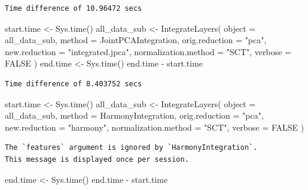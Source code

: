 \documentclass[
  letterpaper,
  DIV=11,
  numbers=noendperiod]{scrreprt}
\newenvironment{Shaded}{\begin{snugshade}}{\end{snugshade}}
\newcommand{\AttributeTok}[1]{\textcolor[rgb]{0.40,0.45,0.13}{#1}}
\newcommand{\ConstantTok}[1]{\textcolor[rgb]{0.56,0.35,0.01}{#1}}
\newcommand{\FunctionTok}[1]{\textcolor[rgb]{0.28,0.35,0.67}{#1}}
\newcommand{\NormalTok}[1]{\textcolor[rgb]{0.00,0.23,0.31}{#1}}
\newcommand{\OtherTok}[1]{\textcolor[rgb]{0.00,0.23,0.31}{#1}}
\newcommand{\SpecialCharTok}[1]{\textcolor[rgb]{0.37,0.37,0.37}{#1}}
\newcommand{\StringTok}[1]{\textcolor[rgb]{0.13,0.47,0.30}{#1}}
\begin{document}
\begin{verbatim}
Time difference of 10.96472 secs
\end{verbatim}

\begin{Shaded}
\begin{Highlighting}[]
\NormalTok{start.time }\OtherTok{\textless{}{-}} \FunctionTok{Sys.time}\NormalTok{()}
\NormalTok{all\_data\_sub }\OtherTok{\textless{}{-}} \FunctionTok{IntegrateLayers}\NormalTok{(}
  \AttributeTok{object =}\NormalTok{ all\_data\_sub, }\AttributeTok{method =}\NormalTok{ JointPCAIntegration,}
  \AttributeTok{orig.reduction =} \StringTok{"pca"}\NormalTok{, }\AttributeTok{new.reduction =} \StringTok{"integrated.jpca"}\NormalTok{, }\AttributeTok{normalization.method =} \StringTok{"SCT"}\NormalTok{,}
  \AttributeTok{verbose =} \ConstantTok{FALSE}
\NormalTok{)}
\NormalTok{end.time }\OtherTok{\textless{}{-}} \FunctionTok{Sys.time}\NormalTok{()}
\NormalTok{end.time }\SpecialCharTok{{-}}\NormalTok{ start.time}
\end{Highlighting}
\end{Shaded}

\begin{verbatim}
Time difference of 8.403752 secs
\end{verbatim}

\begin{Shaded}
\begin{Highlighting}[]
\NormalTok{start.time }\OtherTok{\textless{}{-}} \FunctionTok{Sys.time}\NormalTok{()}
\NormalTok{all\_data\_sub }\OtherTok{\textless{}{-}} \FunctionTok{IntegrateLayers}\NormalTok{(}
  \AttributeTok{object =}\NormalTok{ all\_data\_sub, }\AttributeTok{method =}\NormalTok{ HarmonyIntegration,}
  \AttributeTok{orig.reduction =} \StringTok{"pca"}\NormalTok{, }\AttributeTok{new.reduction =} \StringTok{"harmony"}\NormalTok{, }\AttributeTok{normalization.method =} \StringTok{"SCT"}\NormalTok{,}
  \AttributeTok{verbose =} \ConstantTok{FALSE}
\NormalTok{)}
\end{Highlighting}
\end{Shaded}

\begin{verbatim}
The `features` argument is ignored by `HarmonyIntegration`.
This message is displayed once per session.
\end{verbatim}

\begin{Shaded}
\begin{Highlighting}[]
\NormalTok{end.time }\OtherTok{\textless{}{-}} \FunctionTok{Sys.time}\NormalTok{()}
\NormalTok{end.time }\SpecialCharTok{{-}}\NormalTok{ start.time}
\end{Highlighting}
\end{Shaded}
\end{document}
